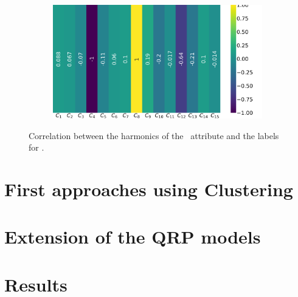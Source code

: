 \begin{figure}[!h]
\begin{subfigure}{0.49\linewidth}
	\end{subfigure}
	\begin{subfigure}{0.49\linewidth}
		\includegraphics[width=\linewidth]{img/qlp_corr/An_coil3.png}
	\end{subfigure}
	\caption{Correlation between the harmonics of the \an\ attribute and the labels for \qlp.}
	\label{fig:an-lcorr-qlp}
\end{figure}

\subsubsection{\bn}

\subsubsection{\cnmod}

\subsubsection{\phin}

\section{First approaches using Clustering}
\section{Extension of the QRP models}
\section{Results}

